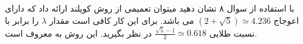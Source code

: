 با استفاده از سوال ۸ نشان دهید میتوان تعمیمی از روش کوپلند ارائه داد که دارای اعوجاج
$(2 + \sqrt{5}) \simeq 4.236$
می باشد. برای این کار کافی است مقدار
$\lambda$
را برابر با نسبت طلایی
$\frac{\sqrt{5} - 1}{2} \simeq 0.618$
در نظر بگیرید. این روش به
معروف است.